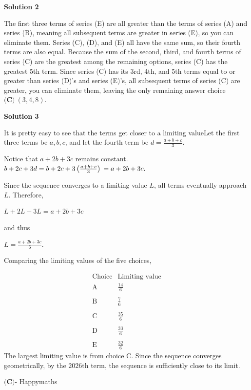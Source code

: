 \begin{enumerate}
\textbf{Solution 2}

The first three terms of series (E) are all greater than the terms of series (A) and series (B), meaning all subsequent terms are greater in series (E), so you can eliminate them. Series (C), (D), and (E) all have the same sum, so their fourth terms are also equal. Because the sum of the second, third, and fourth terms of series (C) are the greatest among the remaining options, series (C) has the greatest 5th term. Since series (C) has its 3rd, 4th, and 5th terms equal to or greater than series (D)'s and series (E)'s, all subsequent terms of series (C) are greater, you can eliminate them, leaving the only remaining answer choice $\boxed{\textbf{(C)}\ (3, 4, 8)}.$




\textbf{Solution 3}

It is pretty easy to see that the terms get closer to a limiting valueLet the first three terms be $a,b,c$, and let the fourth term be $d=\frac{a+b+c}{3}$.

 Notice that $a+2b+3c$ remains constant.$b+2c+3d =b+2c+3\left(\frac{a+b+c}{3}\right)\\ =a+2b+3c.$

 Since the sequence converges to a limiting value $L$, all terms eventually approach $L$. Therefore,

 $L+2L+3L=a+2b+3c$

 and thus

 $L=\frac{a+2b+3c}{6}$.

 Comparing the limiting values of the five choices,

 
 \[\begin{array}{c|c} \text{Choice}&\text{Limiting value}\\ \hline \text{A}&\frac{14}{6}\\ \text{}&\text{}\\ \text{B}&\frac{7}{6}\\ \text{}&\text{}\\ \text{C}&\frac{35}{6}\\ \text{}&\text{}\\ \text{D}&\frac{33}{6}\\ \text{}&\text{}\\ \text{E}&\frac{32}{6} \end{array}\]The largest limiting value is from choice C. Since the sequence converges geometrically, by the $2026$th term, the sequence is sufficiently close to its limit.

 $\boxed{\textbf{(C)}}$- Happymaths


\end{enumerate}
